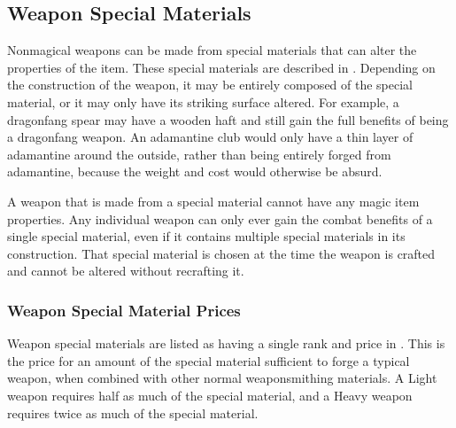   \subsection{Weapon Special Materials}\label{Weapon Special Materials}
    Nonmagical weapons can be made from special materials that can alter the properties of the item.
    These special materials are described in .
    Depending on the construction of the weapon, it may be entirely composed of the special material, or it may only have its striking surface altered.
    For example, a dragonfang spear may have a wooden haft and still gain the full benefits of being a dragonfang weapon.
    An adamantine club would only have a thin layer of adamantine around the outside, rather than being entirely forged from adamantine, because the weight and cost would otherwise be absurd.

    A weapon that is made from a special material cannot have any magic item properties.
    Any individual weapon can only ever gain the combat benefits of a single special material, even if it contains multiple special materials in its construction.
    That special material is chosen at the time the weapon is crafted and cannot be altered without recrafting it.

    \subsubsection{Weapon Special Material Prices}
      Weapon special materials are listed as having a single rank and price in .
      This is the price for an amount of the special material sufficient to forge a typical weapon, when combined with other normal weaponsmithing materials.
      A Light weapon requires half as much of the special material, and a Heavy weapon requires twice as much of the special material.

